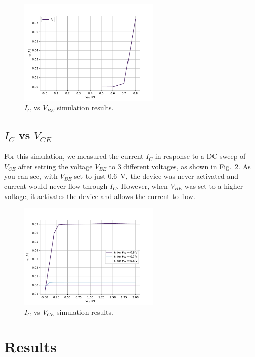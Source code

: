 \documentclass{../../ece-report}
\begin{document}
\begin{figure}[h!]
  \centering
  \includegraphics[width=0.6\textwidth]{../plots/pdf/sim_sweep_vbe.pdf}
  \caption{$I_C$ vs $V_{BE}$ simulation results.}
  \label{plot:sim_ic_vbe}
\end{figure}

\subsection*{$I_C$ vs $V_{CE}$}

For this simulation, we measured the current $I_C$ in
response to a DC sweep of $V_{CE}$ after setting the
voltage $V_{BE}$ to 3 different voltages, as shown in
Fig.~\ref{plot:sim_ic_vce}. As you can see, with $V_{BE}$ set to 
just 0.6~V, the device was never activated and current would
never flow through $I_C$. However, when $V_{BE}$ was set to a 
higher voltage, it activates the device and allows the current
to flow. 

\begin{figure}[h!]
  \centering
  \includegraphics[width=0.6\textwidth]{../plots/pdf/sim_sweep_vce.pdf}
  \caption{$I_C$ vs $V_{CE}$ simulation results.}
  \label{plot:sim_ic_vce}
\end{figure}

\section{Results}
\end{document}
